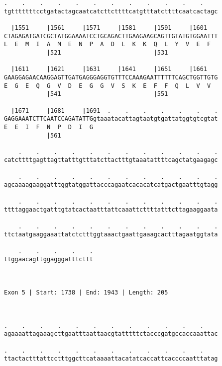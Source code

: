 \documentclass{article}
\begin{document}
\begin{Verbatim}
.    .    .    .    .    .    .    .    .    .    .    .    
tgtttttttcctgatactagcaatcatcttcttttcatgtttatcttttcaatcactagc
                                                            
  |1551     |1561     |1571     |1581     |1591     |1601   
CTAGAGATGATCGCTATGGAAAATCCTGCAGACTTGAAGAAGCAGTTGTATGTGGAATTT
L  E  M  I  A  M  E  N  P  A  D  L  K  K  Q  L  Y  V  E  F  
            |521                          |531              
  
  |1611     |1621     |1631     |1641     |1651     |1661   
GAAGGAGAACAAGGAGTTGATGAGGGAGGTGTTTCCAAAGAATTTTTTCAGCTGGTTGTG
E  G  E  Q  G  V  D  E  G  G  V  S  K  E  F  F  Q  L  V  V  
            |541                          |551              
  
  |1671     |1681     |1691  .    .    .    .    .    .    .
GAGGAAATCTTCAATCCAGATATTGgtaaatacattagtaatgtgattatggtgtcgtat
E  E  I  F  N  P  D  I  G                                   
            |561                                            
  
    .    .    .    .    .    .    .    .    .    .    .    .
catcttttgagttagttatttgtttatcttactttgtaaatattttcagctatgaagagc
                                                            
    .    .    .    .    .    .    .    .    .    .    .    .
agcaaaagaaggatttggtatggattacccagaatcacacatcatgactgaatttgtagg
                                                            
    .    .    .    .    .    .    .    .    .    .    .    .
ttttaggaactgatttgtatcactaatttattcaaattcttttatttcttagaaggaata
                                                            
    .    .    .    .    .    .    .    .    .    .    .    .
ttctaatgaaggaaattatctctttggtaaactgaattgaaagcactttagaatggtata
                                                            
    .    .    .    .    .
ttggaacagttggagggatttcttt
                         
                         
 
Exon 5 | Start: 1738 | End: 1943 | Length: 205



.    .    .    .    .    .    .    .    .    .    .    .    
agaaaattagaaagcttgaatttaattaacgtatttttctacccgatgccaccaaattac
                                                            
.    .    .    .    .    .    .    .    .    .    .    .    
ttactactttattcctttggcttcataaaattacatatcaccattcaccccaatttatag
                                                            

\end{Verbatim}
\end{document}
